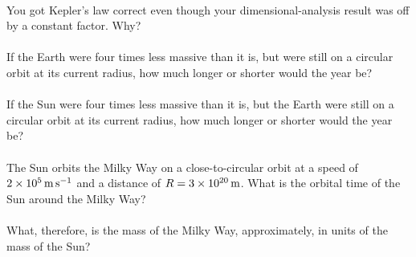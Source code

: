 \documentclass[12pt]{article}
\begin{document}
\paragraph{\theproblem}%
You got Kepler's law correct even though your dimensional-analysis result
was off by a constant factor.  Why?

\paragraph{\theproblem}%
If the Earth were four times less massive than it is, but were still on
a circular orbit at its current radius, how much longer or shorter
would the year be?

\paragraph{\theproblem}%
If the Sun were four times less massive than it is, but the Earth were
still on a circular orbit at its current radius, how much longer or
shorter would the year be?

\paragraph{\theproblem}%
The Sun orbits the Milky Way on a close-to-circular orbit at a speed
of $2\times 10^5\,\mathrm{m}\,\mathrm{s}^{-1}$ and a distance of $R= 3\times 10^{20}\,\mathrm{m}$.
What is the orbital time of the Sun around the Milky Way?

\paragraph{\theproblem}%
What, therefore, is the mass of the Milky Way, approximately, in units
of the mass of the Sun?
\end{document}
